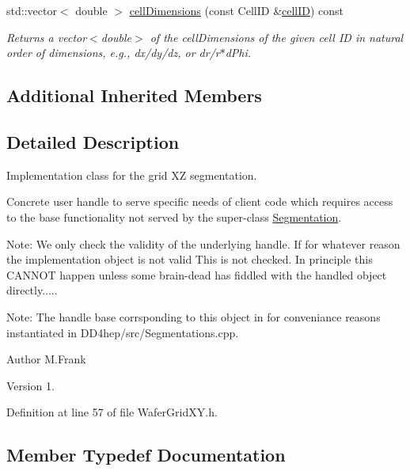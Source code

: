 \begin{DoxyCompactItemize}
std\+::vector$<$ double $>$ \hyperlink{class_d_d4hep_1_1_geometry_1_1_wafer_grid_x_y_af2d96aa43a3f2a574dca41c248791204}{cell\+Dimensions} (const Cell\+ID \&\hyperlink{class_d_d4hep_1_1_geometry_1_1_wafer_grid_x_y_a76a056c88d1711ba099c220db7e54a98}{cell\+ID}) const
\begin{DoxyCompactList}\small\item\em Returns a vector$<$double$>$ of the cell\+Dimensions of the given cell ID in natural order of dimensions, e.\+g., dx/dy/dz, or dr/r$\ast$d\+Phi. \end{DoxyCompactList}\end{DoxyCompactItemize}
\subsection*{Additional Inherited Members}


\subsection{Detailed Description}
Implementation class for the grid XZ segmentation. 

Concrete user handle to serve specific needs of client code which requires access to the base functionality not served by the super-\/class \hyperlink{class_d_d4hep_1_1_geometry_1_1_segmentation}{Segmentation}.

Note\+: We only check the validity of the underlying handle. If for whatever reason the implementation object is not valid This is not checked. In principle this C\+A\+N\+N\+OT happen unless some brain-\/dead has fiddled with the handled object directly.....

Note\+: The handle base corrsponding to this object in for conveniance reasons instantiated in D\+D4hep/src/\+Segmentations.\+cpp.

\begin{DoxyAuthor}{Author}
M.\+Frank 
\end{DoxyAuthor}
\begin{DoxyVersion}{Version}
1. 
\end{DoxyVersion}


Definition at line 57 of file Wafer\+Grid\+X\+Y.\+h.



\subsection{Member Typedef Documentation}
\hypertarget{class_d_d4hep_1_1_geometry_1_1_wafer_grid_x_y_a94a234312cc2c123569319d3d33b24e0}{}\label{class_d_d4hep_1_1_geometry_1_1_wafer_grid_x_y_a94a234312cc2c123569319d3d33b24e0} 
